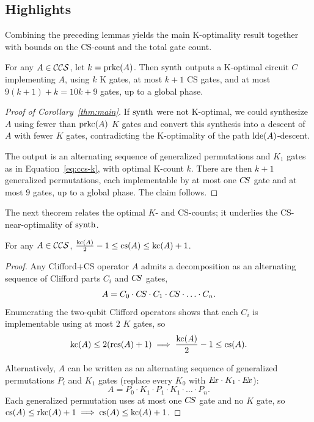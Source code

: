 \documentclass[reprint,amsmath,amssymb,aps,pra]{revtex4-2}
\begin{document}
\subsection{Highlights}

Combining the preceding lemmas yields the main K-optimality result
together with bounds on the CS-count and the total gate count.

\begin{corollary}\label{thm:main}
  For any $A \in {\mathcal{CCS}}$, let $k=\operatorname{prkc}(A)$. Then $\operatorname{synth}$ outputs
  a K-optimal circuit $C$ implementing $A$, using $k$ K gates, at most
  $k+1$ CS gates, and at most $9(k+1) + k = 10k+9$ gates, up to a
  global phase.
\end{corollary}

\begin{proof}[Proof of Corollary~\ref{thm:main}]
  If $\operatorname{synth}$ were not K-optimal, we could synthesize $A$ using fewer
  than $\operatorname{prkc}(A)$ $K$ gates and convert this synthesis into a descent
  of $A$ with fewer $K$ gates, contradicting the K-optimality of the
  path $\operatorname{lde}(A)$-descent.

  The output is an alternating sequence of generalized permutations
  and $K_1$ gates as in Equation~\eqref{eq:ccs-k}, with optimal
  K-count $k$. There are then $k+1$ generalized permutations, each
  implementable by at most one $C\kern-.16667em S$ gate and at most $9$ gates, up to
  a global phase. The claim follows.
\end{proof}

The next theorem relates the optimal $K$- and CS-counts; it underlies
the CS-near-optimality of $\operatorname{synth}$.

\begin{theorem}
  \label{thm:csbd}
  For any $A \in {\mathcal{CCS}}$,
  $\frac{\operatorname{kc}(A)}{2} - 1 \le \operatorname{cs}(A) \le \operatorname{kc}(A) + 1$.
\end{theorem}

\begin{proof}
  Any Clifford+CS operator $A$ admits a decomposition as an
  alternating sequence of Clifford parts $C_i$ and $C\kern-.16667em S$ gates,
  \begin{equation} \label{eq:ccs} A = C_0 \cdot C\kern-.16667em S \cdot C_1 \cdot
    C\kern-.16667em S \cdot \ldots \cdot C_n.
  \end{equation}
  Enumerating the two-qubit Clifford operators shows that each $C_i$
  is implementable using at most $2$ $K$ gates, so
  \[
    \operatorname{kc}(A) \le 2(\operatorname{rcs}(A) + 1) \implies \frac{\operatorname{kc}(A)}{2} - 1 \le
    \operatorname{cs}(A).
  \]

  Alternatively, $A$ can be written as an alternating sequence of
  generalized permutations $P_i$ and $K_1$ gates (replace every $K_0$
  with $E\kern-.16667em x \cdot K_1 \cdot E\kern-.16667em x$):
  \begin{equation} \label{eq:ccs-k} A = P_0 \cdot K_1 \cdot P_1 \cdot
    K_1 \cdot \ldots \cdot P_n.
  \end{equation}
  Each generalized permutation uses at most one $C\kern-.16667em S$ gate and no $K$
  gate, so $ \operatorname{cs}(A) \le \operatorname{rkc}(A) + 1 \implies \operatorname{cs}(A) \le \operatorname{kc}(A) + 1$.
\end{proof}
\end{document}
